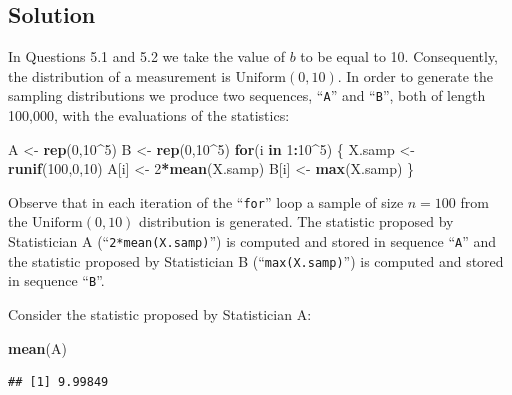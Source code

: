 \documentclass[
]{krantz}
\makeatletter
\newenvironment{Shaded}{\begin{snugshade}}{\end{snugshade}}
\newcommand{\ControlFlowTok}[1]{\textcolor[rgb]{0.13,0.29,0.53}{\textbf{#1}}}
\newcommand{\DecValTok}[1]{\textcolor[rgb]{0.00,0.00,0.81}{#1}}
\newcommand{\KeywordTok}[1]{\textcolor[rgb]{0.13,0.29,0.53}{\textbf{#1}}}
\newcommand{\NormalTok}[1]{#1}
\newcommand{\OperatorTok}[1]{\textcolor[rgb]{0.81,0.36,0.00}{\textbf{#1}}}
\newcommand{\StringTok}[1]{\textcolor[rgb]{0.31,0.60,0.02}{#1}}
\newenvironment{kframe}{%
\medskip{}
\setlength{\fboxsep}{.8em}
 \def\at@end@of@kframe{}%
 \ifinner\ifhmode%
  \def\at@end@of@kframe{\end{minipage}}%
  \begin{minipage}{\columnwidth}%
 \fi\fi%
 \def\FrameCommand##1{\hskip\@totalleftmargin \hskip-\fboxsep
 \colorbox{shadecolor}{##1}\hskip-\fboxsep
     \hskip-\linewidth \hskip-\@totalleftmargin \hskip\columnwidth}%
 \MakeFramed {\advance\hsize-\width
   \@totalleftmargin\z@ \linewidth\hsize
   \@setminipage}}%
 {\par\unskip\endMakeFramed%
 \at@end@of@kframe}
\renewenvironment{Shaded}{\begin{kframe}}{\end{kframe}}
\theoremstyle{definition}
\theoremstyle{definition}
\theoremstyle{definition}
\theoremstyle{remark}
\makeatother
\begin{document}
\hypertarget{solution-4}{%
\subsection*{Solution}\label{solution-4}}


In Questions 5.1 and 5.2 we take the value of \(b\) to be equal to 10.
Consequently, the distribution of a measurement is
\(\mbox{Uniform}(0,10)\). In order to generate the sampling distributions
we produce two sequences, ``\texttt{A}'' and ``\texttt{B}'', both of length 100,000, with
the evaluations of the statistics:

\begin{Shaded}
\begin{Highlighting}[]
\NormalTok{A <-}\StringTok{ }\KeywordTok{rep}\NormalTok{(}\DecValTok{0}\NormalTok{,}\DecValTok{10}\OperatorTok{^}\DecValTok{5}\NormalTok{)}
\NormalTok{B <-}\StringTok{ }\KeywordTok{rep}\NormalTok{(}\DecValTok{0}\NormalTok{,}\DecValTok{10}\OperatorTok{^}\DecValTok{5}\NormalTok{)}
\ControlFlowTok{for}\NormalTok{(i }\ControlFlowTok{in} \DecValTok{1}\OperatorTok{:}\DecValTok{10}\OperatorTok{^}\DecValTok{5}\NormalTok{) \{}
\NormalTok{  X.samp <-}\StringTok{ }\KeywordTok{runif}\NormalTok{(}\DecValTok{100}\NormalTok{,}\DecValTok{0}\NormalTok{,}\DecValTok{10}\NormalTok{)}
\NormalTok{  A[i] <-}\StringTok{ }\DecValTok{2}\OperatorTok{*}\KeywordTok{mean}\NormalTok{(X.samp)}
\NormalTok{  B[i] <-}\StringTok{ }\KeywordTok{max}\NormalTok{(X.samp)}
\NormalTok{\}}
\end{Highlighting}
\end{Shaded}

Observe that in each iteration of the ``\texttt{for}'' loop a sample of size
\(n=100\) from the \(\mbox{Uniform}(0,10)\) distribution is generated. The
statistic proposed by Statistician A (``\texttt{2*mean(X.samp)}'') is computed
and stored in sequence ``\texttt{A}'' and the statistic proposed by Statistician
B (``\texttt{max(X.samp)}'') is computed and stored in sequence ``\texttt{B}''.

Consider the statistic proposed by Statistician A:

\begin{Shaded}
\begin{Highlighting}[]
\KeywordTok{mean}\NormalTok{(A)}
\end{Highlighting}
\end{Shaded}

\begin{verbatim}
## [1] 9.99849
\end{verbatim}
\end{document}
